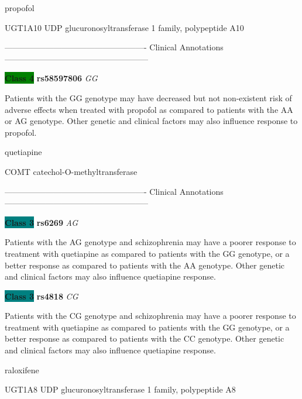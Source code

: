 \documentclass{resume} %
\begin{document}
\begin{rSection}{ propofol }
\begin{rSubsection}{ UGT1A10 }{ UDP glucuronosyltransferase 1 family, polypeptide A10 }{}{}
\item[] ---------------------------------------------------- Clinical Annotations -----------------------------------------------------\newline
\item \textbf{\colorbox{green} {Class 4}} \textbf{ rs58597806 } \textit{ GG }
\item[] Patients with the GG genotype may have decreased but not non-existent risk of adverse effects when treated with propofol as compared to patients with the AA or AG genotype. Other genetic and clinical factors may also influence response to propofol.
\end{rSubsection}

\end{rSection}\begin{rSection}{ quetiapine }
\item[]

\begin{rSubsection}{ COMT }{ catechol-O-methyltransferase }{}{}
\item[]

\item[] ---------------------------------------------------- Clinical Annotations -----------------------------------------------------\newline
\item \textbf{\colorbox{teal} {Class 3}} \textbf{ rs6269 } \textit{ AG }
\item[] Patients with the AG genotype and schizophrenia may have a poorer response to treatment with quetiapine as compared to patients with the GG genotype, or a better response as compared to patients with the AA genotype. Other genetic and clinical factors may also influence quetiapine response. \item \textbf{\colorbox{teal} {Class 3}} \textbf{ rs4818 } \textit{ CG }
\item[] Patients with the CG genotype and schizophrenia may have a poorer response to treatment with quetiapine as compared to patients with the GG genotype, or a better response as compared to patients with the CC genotype. Other genetic and clinical factors may also influence quetiapine response. 
\end{rSubsection}

\end{rSection}\begin{rSection}{ raloxifene }
\item[]

\begin{rSubsection}{ UGT1A8 }{ UDP glucuronosyltransferase 1 family, polypeptide A8 }{}{}
\item[]


\end{rSubsection}
\end{rSection}
\end{document}
